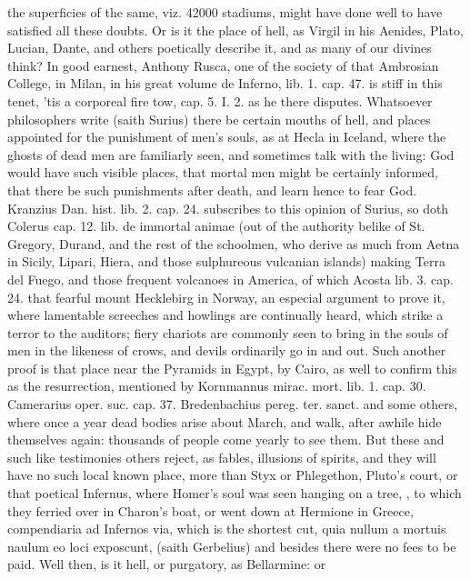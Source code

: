{the superficies of the same, viz. 42\thinspace{}000 stadiums, might have done well
to have satisfied all these doubts. Or is it the place of hell, as
Virgil in his Aenides, Plato, Lucian, Dante, and others poetically
describe it, and as many of our divines think? In good earnest, Anthony
Rusca, one of the society of that Ambrosian College, in Milan, in his
great volume de Inferno, lib. 1. cap. 47. is stiff in this tenet, 'tis
a corporeal fire tow, cap. 5. I. 2. as he there disputes. Whatsoever
philosophers write (saith Surius) there be certain mouths of
hell, and places appointed for the punishment of men's souls, as at
Hecla in Iceland, where the ghosts of dead men are familiarly seen, and
sometimes talk with the living: God would have such visible places,
that mortal men might be certainly informed, that there be such
punishments after death, and learn hence to fear God. Kranzius Dan.
hist. lib. 2. cap. 24. subscribes to this opinion of Surius, so doth
Colerus cap. 12. lib. de immortal animae (out of the authority belike
of St. Gregory, Durand, and the rest of the schoolmen, who derive as
much from Aetna in Sicily, Lipari, Hiera, and those sulphureous
vulcanian islands) making Terra del Fuego, and those frequent volcanoes
in America, of which Acosta lib. 3. cap. 24. that fearful mount
Hecklebirg in Norway, an especial argument to prove it, where
lamentable screeches and howlings are continually heard, which strike a
terror to the auditors; fiery chariots are commonly seen to bring in
the souls of men in the likeness of crows, and devils ordinarily go in
and out. Such another proof is that place near the Pyramids in Egypt,
by Cairo, as well to confirm this as the resurrection, mentioned by
Kornmannus mirac. mort. lib. 1. cap. 30. Camerarius oper. suc.
cap. 37. Bredenbachius pereg. ter. sanct. and some others, where once a
year dead bodies arise about March, and walk, after awhile hide
themselves again: thousands of people come yearly to see them. But
these and such like testimonies others reject, as fables, illusions of
spirits, and they will have no such local known place, more than Styx
or Phlegethon, Pluto's court, or that poetical Infernus, where Homer's
soul was seen hanging on a tree, \etc{}, to which they ferried over in
Charon's boat, or went down at Hermione in Greece, compendiaria ad
Infernos via, which is the shortest cut, quia nullum a mortuis naulum
eo loci exposcunt, (saith Gerbelius) and besides there were no
fees to be paid. Well then, is it hell, or purgatory, as Bellarmine: or
}
